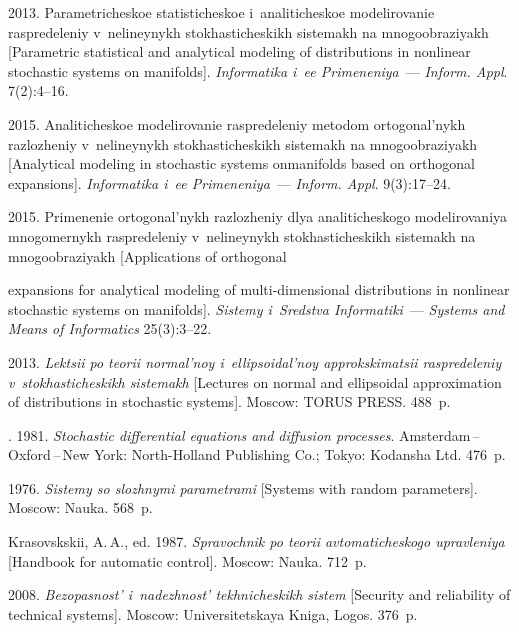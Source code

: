 \begin{multicols}{2}
{{\begin{thebibliography}{99}
 2013.
Parametricheskoe statisticheskoe i~analiticheskoe modelirovanie raspredeleniy 
v~ne\-li\-ney\-nykh stokhasticheskikh sistemakh na mnogoobraziyakh [Parametric statistical 
and analytical modeling of distributions in nonlinear stochastic systems on manifolds]. 
\textit{Informatika i~ee Primeneniya}~--- \textit{Inform. Appl}. 7(2):4--16.

 2015.
Analiticheskoe modelirovanie ras\-predeleniy metodom ortogonal'nykh razlozheniy 
v~nelineynykh stokhasticheskikh sistemakh na mno\-go\-ob\-ra\-ziyakh [Analytical 
modeling in stochastic systems on\linebreak manifolds based on orthogonal expansions].
\textit{Informatika i~ee Primeneniya}~--- \textit{Inform. Appl}. 9(3):17--24.

 2015.
Primenenie ortogonal'nykh raz\-lo\-zheniy dlya analiticheskogo modelirovaniya 
mno\-go\-mer\-nykh 
raspredeleniy v~nelineynykh stokhasticheskikh sistemakh na mno\-go\-ob\-ra\-zi\-yakh 
[Applications of orthogonal\linebreak\vspace*{-12pt}

\pagebreak

\noindent
 expansions for analytical modeling of multi-dimensional 
distributions in nonlinear stochastic systems on manifolds].
\textit{Sistemy i~Sredstva Informatiki}~--- \textit{Systems and Means of Informatics}
 25(3):3--22.

 2013.
\textit{Lektsii po teorii normal'noy i~ellipsoidal'noy approkskimatsii raspredeleniy
 v~stokhasticheskikh sistemakh} [Lectures on normal and ellipsoidal approximation 
 of distributions in stochastic systems].  Moscow: TORUS PRESS.  488~p.


. 1981. 
\textit{Stochastic differential equations and diffusion processes}. 
Amsterdam\,--\,Oxford\,--\,New York: North-Holland Publishing Co.; 
Tokyo: Kodansha Ltd. 476~p.



 1976.
\textit{Sistemy so slozhnymi parametrami} [Systems with random parameters]. 
Moscow: Nauka. 568~p.

Krasovskskii, A.\,A., ed.  1987.
\textit{Spravochnik po teorii avtomaticheskogo upravleniya} 
[Handbook for automatic control]. Moscow:   Nauka. 712~p.

 2008.
\textit{Bezopasnost' i~nadezhnost' tekhnicheskikh sistem} [Security and reliability 
of technical systems]. Moscow:  Universitetskaya Kniga, Logos.  
376~p.
\end{thebibliography}

 }
 }

\end{multicols}

